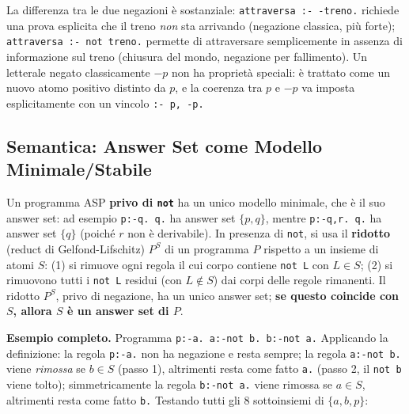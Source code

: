 \documentclass[a4paper,11pt]{article}
\begin{document}
La differenza tra le due negazioni è sostanziale: \texttt{attraversa :- -treno.} richiede una prova esplicita che il treno \emph{non} sta arrivando (negazione classica, più forte); \texttt{attraversa :- not treno.} permette di attraversare semplicemente in assenza di informazione sul treno (chiusura del mondo, negazione per fallimento). Un letterale negato classicamente $-p$ non ha proprietà speciali: è trattato come un nuovo atomo positivo distinto da $p$, e la coerenza tra $p$ e $-p$ va imposta esplicitamente con un vincolo \texttt{:- p, -p.}

\subsection{Semantica: Answer Set come Modello Minimale/Stabile}

Un programma ASP \textbf{privo di \texttt{not}} ha un unico modello minimale, che è il suo answer set: ad esempio \texttt{p:-q. q.} ha answer set $\{p,q\}$, mentre \texttt{p:-q,r. q.} ha answer set $\{q\}$ (poiché $r$ non è derivabile). In presenza di \texttt{not}, si usa il \textbf{ridotto} (reduct di Gelfond-Lifschitz) $P^S$ di un programma $P$ rispetto a un insieme di atomi $S$: (1) si rimuove ogni regola il cui corpo contiene \texttt{not L} con $L\in S$; (2) si rimuovono tutti i \texttt{not L} residui (con $L\notin S$) dai corpi delle regole rimanenti. Il ridotto $P^S$, privo di negazione, ha un unico answer set; \textbf{se questo coincide con $S$, allora $S$ è un answer set di $P$}.

\textbf{Esempio completo.} Programma \texttt{p:-a. a:-not b. b:-not a.} Applicando la definizione: la regola \texttt{p:-a.} non ha negazione e resta sempre; la regola \texttt{a:-not b.} viene \emph{rimossa} se $b\in S$ (passo 1), altrimenti resta come fatto \texttt{a.} (passo 2, il \texttt{not b} viene tolto); simmetricamente la regola \texttt{b:-not a.} viene rimossa se $a\in S$, altrimenti resta come fatto \texttt{b.} Testando tutti gli 8 sottoinsiemi di $\{a,b,p\}$:
\end{document}
